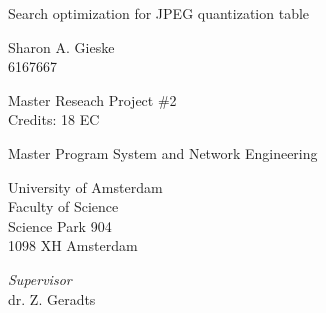 
\begin{titlepage}

\begin{addmargin}[-3cm]{-2cm}
\begin{center}

\vspace{2.5cm}

\begin{Huge}
Search optimization for JPEG quantization table

\end{Huge}

\vspace{1.5cm}

Sharon A. Gieske\\
6167667

\vspace{1.5cm}

Master Reseach Project \#2\\
Credits: 18 EC

\vspace{0.5cm}

Master Program System and Network Engineering

\vspace{0.25cm}

University of Amsterdam\\
Faculty of Science\\
Science Park 904\\
1098 XH Amsterdam

\vspace{4cm}

\emph{Supervisor}\\
dr. Z. Geradts

\vspace{0.25cm}


\end{center}
\end{addmargin}
\end{titlepage}
